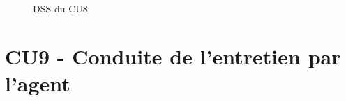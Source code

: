 \begin{figure}[H]
\noindent{}
\caption{DSS du CU8}
\end{figure}

\clearpage
\section{CU9 - Conduite de l’entretien par l’agent}

